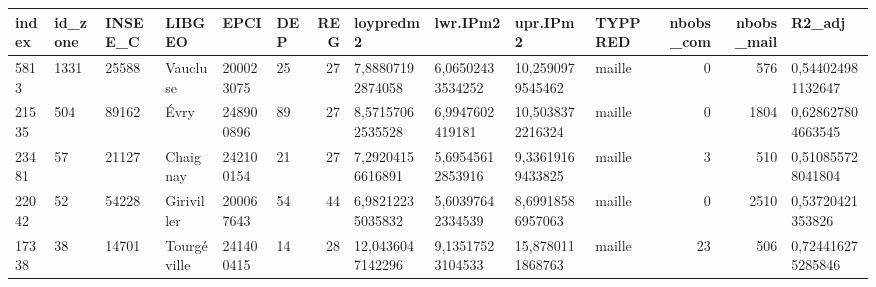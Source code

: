 \begin{tabular}{llllllrllllrrl}
\toprule
\textbf{index} & \textbf{id\_zone} & \textbf{INSEE\_C} &       \textbf{LIBGEO} &       \textbf{EPCI} & \textbf{DEP} &  \textbf{REG} &         \textbf{loypredm2} &          \textbf{lwr.IPm2} &          \textbf{upr.IPm2} & \textbf{TYPPRED} &  \textbf{nbobs\_com} &  \textbf{nbobs\_mail} &             \textbf{R2\_adj} \\
\midrule
5813  &    1331 &   25588 &     Vaucluse &  200023075 &  25 &   27 &  7,88807192874058 &  6,06502433534252 &  10,2590979545462 &  maille &          0 &         576 &  0,544024981132647 \\
21535 &     504 &   89162 &         Évry &  248900896 &  89 &   27 &  8,57157062535528 &   6,9947602419181 &  10,5038372216324 &  maille &          0 &        1804 &  0,628627804663545 \\
23481 &      57 &   21127 &     Chaignay &  242100154 &  21 &   27 &  7,29204156616891 &  5,69545612853916 &  9,33619169433825 &  maille &          3 &         510 &  0,510855728041804 \\
22042 &      52 &   54228 &   Giriviller &  200067643 &  54 &   44 &  6,98212235035832 &  5,60397642334539 &  8,69918586957063 &  maille &          0 &        2510 &   0,53720421353826 \\
17338 &      38 &   14701 &  Tourgéville &  241400415 &  14 &   28 &  12,0436047142296 &  9,13517523104533 &  15,8780111868763 &  maille &         23 &         506 &  0,724416275285846 \\
\bottomrule
\end{tabular}
